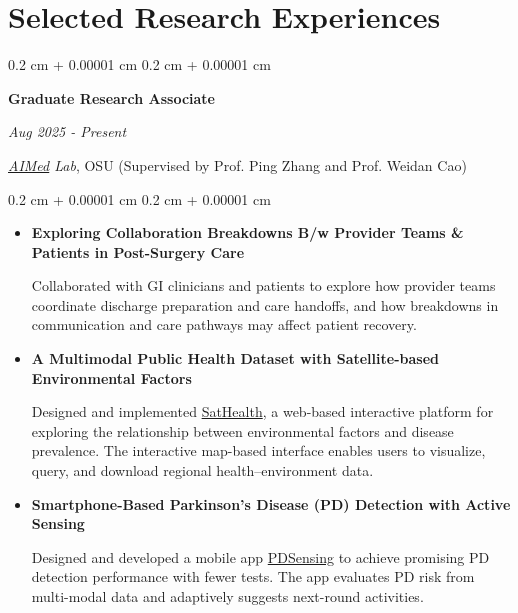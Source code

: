 \documentclass[10pt, letterpaper]{article}
\newenvironment{highlights}{
    \begin{itemize}[
        topsep=0.10 cm,
        parsep=0.10 cm,
        partopsep=0pt,
        itemsep=0pt,
        leftmargin=0.4 cm + 10pt
    ]
}{
    \end{itemize}
} %
\newenvironment{onecolentry}{
    \begin{adjustwidth}{
        0.2 cm + 0.00001 cm
    }{
        0.2 cm + 0.00001 cm
    }
}{
    \end{adjustwidth}
} %
\newenvironment{twocolentry}[2][]{
    \onecolentry
    \def\secondColumn{#2}
    \setcolumnwidth{\fill, 4.5 cm}
    \begin{paracol}{2}
}{
    \switchcolumn \raggedleft \secondColumn
    \end{paracol}
    \endonecolentry
} %
\let\hrefWithoutArrow\href
\renewcommand{\href}[2]{\hrefWithoutArrow{#1}{\ifthenelse{\equal{#2}{}}{ }{#2 }\raisebox{.15ex}{\footnotesize \faExternalLink*}}}
\renewcommand{\href}[2]{\hrefWithoutArrow{#1}{#2}}
\begin{document}

    \section{Selected Research Experiences}

        \begin{twocolentry}{
        \textit{Aug 2025 - Present}}
            \textbf{Graduate Research Associate} 
    \end{twocolentry}
    \hspace{0.2cm}\textit{\href{https://www.pingzhang.net/lab.html}{AIMed} Lab}, OSU (Supervised by Prof. Ping Zhang and Prof. Weidan Cao)


    \begin{onecolentry}
        \begin{highlights}

            \item \textbf{Exploring Collaboration Breakdowns B/w Provider Teams \& Patients in Post-Surgery Care}

            Collaborated with GI clinicians and patients to explore how provider teams coordinate discharge preparation and care handoffs, and how breakdowns in communication and care pathways may affect patient recovery. 

            \item \textbf{A Multimodal Public Health Dataset with Satellite-based Environmental Factors}

            Designed and implemented \href{https://aimed-sathealth.net/}{SatHealth}, a web-based interactive platform for exploring the relationship between environmental factors and disease prevalence. The interactive map-based interface enables users to visualize, query, and download regional health–environment data.
            
            \item \textbf{Smartphone-Based Parkinson’s Disease (PD) Detection with Active Sensing}

            Designed and developed a mobile app \href{https://github.com/XianhuiChen/PDSensing}{PDSensing} to achieve promising PD detection performance with fewer tests. The app evaluates PD risk from multi-modal data and adaptively suggests next-round activities.

        \end{highlights}
    \end{onecolentry}
    
\end{document}
